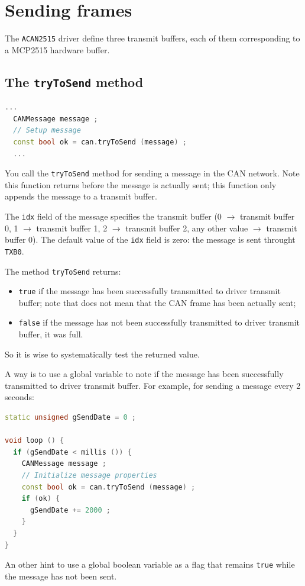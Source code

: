 \documentclass[10pt, a4paper, obeyspaces, openany]{extarticle}
\newcommand \sectionLabel[2]{\section{#1}\label{sec:#2}}
\newcommand \subsectionLabel[2]{\subsection{#1}\label{subsec:#2}}
\begin{document}
\sectionLabel{Sending frames}{sendingFrames}

The \texttt{ACAN2515} driver define three transmit buffers, each of them corresponding to a MCP2515 hardware buffer.

\subsectionLabel{The \texttt{tryToSend} method}{tryToSendMethod}

{\small\begin{lstlisting}[language=c++]
  ...
  CANMessage message ;
  // Setup message
  const bool ok = can.tryToSend (message) ;
  ...
\end{lstlisting}}

You call the \texttt{tryToSend} method for sending a message in the CAN network. Note this function returns before the message is actually sent; this function only appends the message to a transmit buffer.

The \texttt{idx} field of the message specifies the transmit buffer (0 $\rightarrow$ transmit buffer 0, 1 $\rightarrow$ transmit buffer 1, 2 $\rightarrow$ transmit buffer 2, any other value $\rightarrow$ transmit buffer 0). The default value of the \texttt{idx} field is zero: the message is sent throught \texttt{TXB0}.

The method \texttt{tryToSend} returns:
\begin{itemize}
  \item \texttt{true} if the message has been successfully transmitted to driver transmit buffer; note that does not mean that the CAN frame has been actually sent;
  \item \texttt{false} if the message has not been successfully transmitted to driver transmit buffer, it was full.
\end{itemize}

So it is wise to systematically test the returned value.

A way is to use a global variable to note if the message has been successfully transmitted to driver transmit buffer. For example, for sending a message every 2 seconds: 

{\small\begin{lstlisting}[language=c++]
static unsigned gSendDate = 0 ;

void loop () {
  if (gSendDate < millis ()) {
    CANMessage message ;
    // Initialize message properties
    const bool ok = can.tryToSend (message) ;
    if (ok) {
      gSendDate += 2000 ;
    }
  }
}
\end{lstlisting}}

An other hint to use a global boolean variable as a flag that remains \texttt{true} while the message has not been sent.
\end{document}
